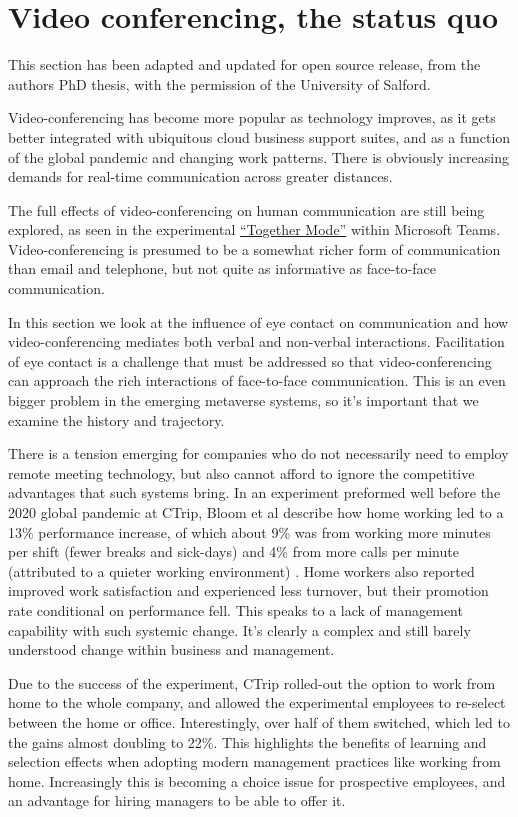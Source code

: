 
\section{Video conferencing, the status quo}
This section has been adapted and updated for open source release, from the authors PhD thesis, with the permission of the University of Salford.\par
Video-conferencing has become more popular as technology improves, as it gets better integrated with ubiquitous cloud business support suites, and as a function of the global pandemic and changing work patterns. There is obviously increasing demands for real-time communication across greater distances.\par
The full effects of video-conferencing on human communication are still being explored, as seen in the experimental \href{https://news.microsoft.com/innovation-stories/microsoft-teams-together-mode/}{``Together Mode''} within Microsoft Teams. Video-conferencing is presumed to be a somewhat richer form of communication than email and telephone, but not quite as informative as face-to-face communication. \par
In this section we look at the influence of eye contact on communication and how video-conferencing mediates both verbal and non-verbal interactions. Facilitation of eye contact is a challenge that must be addressed so that video-conferencing can approach the rich interactions of face-to-face communication. This is an even bigger problem in the emerging metaverse systems, so it's important that we examine the history and trajectory.\par
There is a tension emerging for companies who do not necessarily need to employ remote meeting technology, but also cannot afford to ignore the competitive advantages that such systems bring. In an experiment preformed well before the 2020 global pandemic at CTrip, Bloom et al describe how home working led to a 13\% performance increase, of which about 9\% was from working more minutes per shift (fewer breaks and sick-days) and 4\% from more calls per minute (attributed to a quieter working environment) \cite{Bloom2015}. Home workers also reported improved work satisfaction and experienced less turnover, but their promotion rate conditional on performance fell. This speaks to a lack of management capability with such systemic change. It's clearly a complex and still barely understood change within business and management. \par
Due to the success of the experiment, CTrip rolled-out the option to work from home to the whole company, and allowed the experimental employees to re-select between the home or office. Interestingly, over half of them switched, which led to the gains almost doubling to 22\%. This highlights the benefits of learning and selection effects when adopting modern management practices like working from home. Increasingly this is becoming a choice issue for prospective employees, and an advantage for hiring managers to be able to offer it.\par

